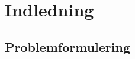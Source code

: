 \documentclass[../main.tex]{subfiles}
\begin{document}
\section{Indledning}
\label{sec:indledning}

\subsection{Problemformulering}
\label{subsec:problemformulering}
\end{document}
